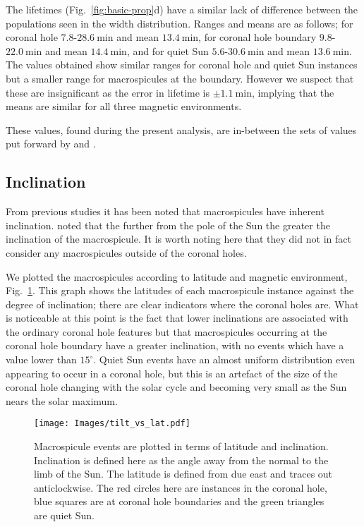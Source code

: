 The lifetimes (Fig.~\ref{fig:basic-prop}d) have a similar lack of difference between the populations seen in the width distribution. Ranges and means are as follows; for coronal hole $7.8$-$28.6\ \textrm{min}$ and mean $13.4\ \textrm{min}$, for coronal hole boundary $9.8$-$22.0\ \textrm{min}$ and mean $14.4\ \textrm{min}$, and for quiet Sun $5.6$-$30.6\ \textrm{min}$ and mean $13.6\ \textrm{min}$. The values obtained show similar ranges for coronal hole and quiet Sun instances but a smaller range for macrospicules at the boundary. However we suspect that these are insignificant as the error in lifetime is $\pm1.1\ \textrm{min}$, implying that the means are similar for all three magnetic environments.

These values, found during the present analysis, are in-between the sets of values put forward by \citealt{Bohlin1975} and \citealt{Dere89}.

\subsection{Inclination} 
From previous studies it has been noted that macrospicules have inherent inclination. \citealt{Bohlin1975} noted that the further from the pole of the Sun the greater the inclination of the macrospicule. It is worth noting here that they did not in fact consider any macrospicules outside of the coronal holes. 

We plotted the macrospicules according to latitude and magnetic environment, Fig.~\ref{fig:tilt-lat}. This graph shows the latitudes of each macrospicule instance against the degree of inclination; there are clear indicators where the coronal holes are. What is noticeable at this point is the fact that lower inclinations are associated with the ordinary coronal hole features but that macrospicules occurring at the coronal hole boundary have a greater inclination, with no events which have a value lower than $15^{\circ}$. Quiet Sun events have an almost uniform distribution even appearing to occur in a coronal hole, but this is an artefact of the size of the coronal hole changing with the solar cycle and becoming very small as the Sun nears the solar maximum. 


\begin{figure}[t!]
	\centering
	\texttt{[image: Images/tilt\_vs\_lat.pdf]}	
	\caption{\small Macrospicule events are plotted in terms of latitude and inclination. Inclination is defined here as the angle away from the normal to the limb of the Sun. The latitude is defined from due east and traces out anticlockwise. The red circles here are instances in the coronal hole, blue squares are at coronal hole boundaries and the green triangles are quiet Sun.}
	\label{fig:tilt-lat}
\end{figure}


